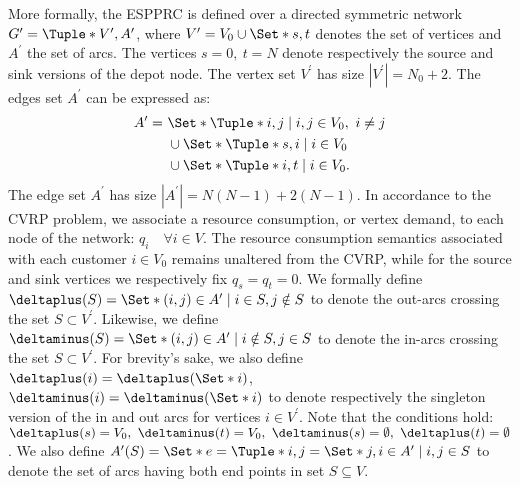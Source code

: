\medskip

More formally, the ESPPRC is defined over a directed symmetric network
$G^\prime = \Tuple*{V^\prime, A^\prime}$,
where $V^\prime = V_0 \cup \Set*{s, t}$ denotes the set of vertices and $A^\prime$ the set of arcs.
The vertices $s = 0,\ t = N$ denote respectively the source and sink versions of the depot node.
The vertex set $V^\prime$ has size $|V^\prime| = N_0 + 2$.
The edges set $A^\prime$ can be expressed as:
\begin{equation}
	\begin{aligned}
		A^\prime = \  & \Set*{\Tuple*{i, j} \mid i, j \in V_0,\ i \ne j} \\
		              & \cup \Set*{\Tuple*{s, i} \mid i \in V_0}         \\
		              & \cup \Set*{\Tuple*{i, t} \mid i \in V_0}.
	\end{aligned}
\end{equation}
The edge set $A^\prime$ has size $|A^\prime| = N(N - 1) + 2(N - 1)$.
In accordance to the CVRP problem,
we associate a resource consumption, or vertex demand,
to each node of the network: $q_i \quad \forall i \in V$.
The resource consumption semantics associated with each customer
$i \in V_0$ remains unaltered  from the CVRP, while for the source and sink vertices
we respectively fix $q_{s} = q_{t} = 0$.
We formally define $\deltaplus(S) = \Set*{(i, j) \in A^\prime \mid i \in S, j \notin S}$
to denote the out-arcs crossing the set $S \subset V^\prime$.
Likewise, we define $\deltaminus(S) = \Set*{(i, j) \in A^\prime \mid i \notin S, j \in S}$
to denote the in-arcs crossing the set $S \subset V^\prime$.
For brevity’s sake,
we also define $\deltaplus(i) = \deltaplus(\Set*{i})$, $\deltaminus(i) = \deltaminus(\Set*{i})$
to denote respectively the singleton version of the in and out arcs for vertices $i \in V^\prime$.
Note that the conditions hold:
$\deltaplus(s) = V_0,\ \deltaminus(t) = V_0,\ \deltaminus(s) = \emptyset,\ \deltaplus(t) = \emptyset$.
We also define $A^\prime(S) = \Set*{e = \Tuple*{i, j} = \Set*{j, i}\in A^\prime \mid i, j \in S}$
to denote the set of arcs having both end points in set $S \subseteq V$.

